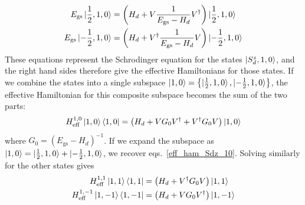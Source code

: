 \documentclass[reprint,prb,superscriptaddress]{revtex4-2}
\begin{document}
\begin{align}
	\label{eff_ham_Sdz_10}
	E_\text{gs} \ket{\frac{1}{2}, 1, 0} &= \left(H_d + V \frac{1}{E_\text{gs} - H_d}V^\dagger\right) \ket{\frac{1}{2}, 1, 0}\\
	E_\text{gs} \ket{-\frac{1}{2}, 1, 0} &= \left(H_d + V^\dagger \frac{1}{E_\text{gs} - H_d} V\right) \ket{-\frac{1}{2}, 1, 0}\\
\end{align}
These equations represent the Schrodinger equation for the states \(\ket{S_d^z, 1, 0}\), and the right hand sides therefore give the effective Hamiltonians for those states. If we combine the states into a single subspace \(\ket{1,0}= \left\{\ket{\frac{1}{2}, 1, 0}, \ket{-\frac{1}{2}, 1, 0}\right\}\), the effective Hamiltonian for this composite subspace becomes the sum of the two parts:
\begin{align}
	\label{eff_ham_10}
	H^{1,0}_\text{eff}\ket{1, 0}\bra{1, 0} = \left(H_d + V G_0 V^\dagger + V^\dagger G_0  V\right) \ket{1, 0}
\end{align}
where \(G_0 = \left(E_\text{gs} - H_d\right)^{-1}\). If we expand the subspace as \(\ket{1,0} = \ket{\frac{1}{2}, 1, 0} + \ket{-\frac{1}{2}, 1, 0}\), we recover eqs.~\ref{eff_ham_Sdz_10}. Solving similarly for the other states gives
\begin{align}
	H^{1,1}_\text{eff}\ket{1,  1}\bra{1,  1} &= \left(H_d + V^\dagger G_0  V\right) \ket{1,  1}\\
	H^{1,-1}_\text{eff}\ket{1, - 1}\bra{1, - 1} &= \left(H_d + V G_0 V^\dagger\right) \ket{1, - 1}
\end{align}
\end{document}
